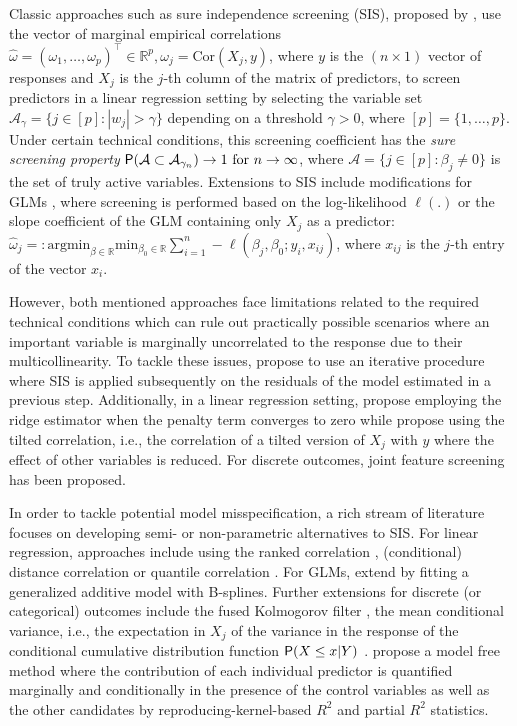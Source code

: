 \documentclass[
  article]{jss}
\begin{document}
Classic approaches such as sure independence screening (SIS), proposed
by \citet{Fan2007SISforUHD}, use the vector of marginal empirical
correlations
\(\hat\omega=(\omega_1,\ldots ,\omega_p)^\top\in\mathbb{R}^p,\omega_j=\text{Cor}(X_{j},y)\),
where \(y\) is the \((n\times 1)\) vector of responses and \(X_{j}\) is
the \(j\)-th column of the matrix of predictors, to screen predictors in
a linear regression setting by selecting the variable set
\(\mathcal{A}_\gamma = \{j\in [p]:|w_j|>\gamma\}\) depending on a
threshold \(\gamma>0\), where \([p]=\{1,\dots,p\}\). Under certain
technical conditions, this screening coefficient has the \emph{sure
screening property}
\(\mathsf{P}(\mathcal{A} \subset \mathcal{A}_{\gamma_n})\to 1 \text{ for } n\to \infty\),
where \(\mathcal{A}=\{j\in[p]:\beta_j\neq 0\}\) is the set of truly
active variables. Extensions to SIS include modifications for GLMs
\citep{Fan2010sisglms}, where screening is performed based on the
log-likelihood \(\ell(.)\) or the slope coefficient of the GLM
containing only \(X_j\) as a predictor:
\(\hat\omega_j=: \text{argmin}_{\beta\in\mathbb{R}}\text{min}_{{\beta_0}\in\mathbb{R}}\sum_{i=1}^n -\ell(\beta_j,\beta_0;y_i,x_{ij})\),
where \(x_{ij}\) is the \(j\)-th entry of the vector \(x_i\).

However, both mentioned approaches face limitations related to the
required technical conditions which can rule out practically possible
scenarios where an important variable is marginally uncorrelated to the
response due to their multicollinearity. To tackle these issues,
\citet{fan2009ultrahigh} propose to use an iterative procedure where SIS
is applied subsequently on the residuals of the model estimated in a
previous step. Additionally, in a linear regression setting,
\citet{Wang2015HOLP} propose employing the ridge estimator when the
penalty term converges to zero while \citet{cho2012high} propose using
the tilted correlation, i.e., the correlation of a tilted version of
\(X_j\) with \(y\) where the effect of other variables is reduced. For
discrete outcomes, joint feature screening \citep{SMLE2014} has been
proposed.

In order to tackle potential model misspecification, a rich stream of
literature focuses on developing semi- or non-parametric alternatives to
SIS. For linear regression, approaches include using the ranked
correlation \citep{zhu2011model}, (conditional) distance correlation
\citep{li2012feature, wang2015conditional} or quantile correlation
\citep{ma2016robust}. For GLMs, \citet{fan2011nonparametric} extend
\citet{Fan2010sisglms} by fitting a generalized additive model with
B-splines. Further extensions for discrete (or categorical) outcomes
include the fused Kolmogorov filter \citep{mai2013kolmogorov}, the mean
conditional variance, i.e., the expectation in \(X_j\) of the variance
in the response of the conditional cumulative distribution function
\(\mathsf{P}(X\leq x|Y)\) \citep{cui2015model}. \citet{ke2023sufficient}
propose a model free method where the contribution of each individual
predictor is quantified marginally and conditionally in the presence of
the control variables as well as the other candidates by
reproducing-kernel-based \(R^2\) and partial \(R^2\) statistics.
\end{document}
